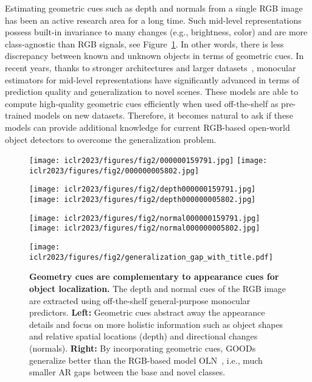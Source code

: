 \documentclass{article} \usepackage{iclr2023_conference,times}
\begin{document}
Estimating geometric cues such as depth and normals from a single RGB image has been an active research area for a long time.
Such mid-level representations possess built-in invariance to many changes (e.g., brightness, color) and are more class-agnostic than RGB signals, see Figure~\ref{fig:mid-vis}. In other words, there is less discrepancy between known and unknown objects in terms of geometric cues.
In recent years, thanks to stronger architectures and larger datasets~\citep{transformer_depth, midas, eftekhar2021omnidata}, monocular estimators for mid-level representations have significantly advanced in terms of prediction quality and generalization to novel scenes. These models are able to compute high-quality geometric cues efficiently when used off-the-shelf as pre-trained models on new datasets. Therefore, it becomes natural to ask if these models can provide additional knowledge for current RGB-based open-world object detectors to overcome the generalization problem.


\begin{figure}[t]
    \centering
     \parbox{\textwidth}{
    \parbox[b]{.2\textwidth}{\texttt{[image: iclr2023/figures/fig2/000000159791.jpg]}
      \texttt{[image: iclr2023/figures/fig2/000000005802.jpg]}
}
    \parbox[b]{.2\textwidth}{\texttt{[image: iclr2023/figures/fig2/depth000000159791.jpg]}
      \texttt{[image: iclr2023/figures/fig2/depth000000005802.jpg]}
}
    \parbox[b]{.2\textwidth}{\texttt{[image: iclr2023/figures/fig2/normal000000159791.jpg]}
    \texttt{[image: iclr2023/figures/fig2/normal000000005802.jpg]}}
\parbox[b]{.4\textwidth}{\texttt{[image: iclr2023/figures/fig2/generalization\_gap\_with\_title.pdf]}
    }}
    
    \caption{\textbf{Geometry cues are complementary to appearance cues for object localization.} The depth and normal cues of the RGB image are extracted using off-the-shelf general-purpose monocular predictors. \textbf{Left:}
    Geometric cues abstract away the appearance details and focus on more holistic information such as object shapes and relative spatial locations (depth) and directional changes (normals). 
    \textbf{Right:}
    By incorporating geometric cues, GOODs generalize better than the RGB-based model OLN~\citep{kim_learning_2021}, i.e., much smaller AR gaps between the base and novel classes.}\vspace{-0.2em}\label{fig:mid-vis} 
\end{figure}
\end{document}
